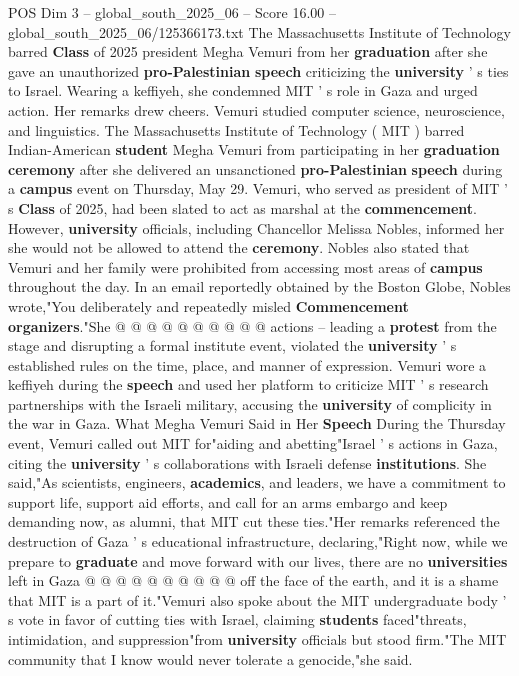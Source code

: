 \begin{textsample}{POS Dim 3 – global\_south\_2025\_06 – Score 16.00 – global\_south\_2025\_06/125366173.txt}  \label{ex:f3_pos_194}
The Massachusetts Institute of Technology barred \textbf{Class} of 2025 president Megha Vemuri from her \textbf{graduation} after she gave an unauthorized \textbf{pro-Palestinian} \textbf{speech} criticizing the \textbf{university} ' s ties to Israel.
Wearing a keffiyeh, she condemned MIT ' s role in Gaza and urged action.
Her remarks drew cheers.
Vemuri studied computer science, neuroscience, and linguistics.
The Massachusetts Institute of Technology ( MIT ) barred Indian-American \textbf{student} Megha Vemuri from participating in her \textbf{graduation} \textbf{ceremony} after she delivered an unsanctioned \textbf{pro-Palestinian} \textbf{speech} during a \textbf{campus} event on Thursday, May 29.
Vemuri, who served as president of MIT ' s \textbf{Class} of 2025, had been slated to act as marshal at the \textbf{commencement}.
However, \textbf{university} officials, including Chancellor Melissa Nobles, informed her she would not be allowed to attend the \textbf{ceremony}.
Nobles also stated that Vemuri and her family were prohibited from accessing most areas of \textbf{campus} throughout the day.
In an email reportedly obtained by the Boston Globe, Nobles wrote,"You deliberately and repeatedly misled \textbf{Commencement} \textbf{organizers}."She @ @ @ @ @ @ @ @ @ @ actions -- leading a \textbf{protest} from the stage and disrupting a formal institute event, violated the \textbf{university} ' s established rules on the time, place, and manner of expression.
Vemuri wore a keffiyeh during the \textbf{speech} and used her platform to criticize MIT ' s research partnerships with the Israeli military, accusing the \textbf{university} of complicity in the war in Gaza.
What Megha Vemuri Said in Her \textbf{Speech} During the Thursday event, Vemuri called out MIT for"aiding and abetting"Israel ' s actions in Gaza, citing the \textbf{university} ' s collaborations with Israeli defense \textbf{institutions}.
She said,"As scientists, engineers, \textbf{academics}, and leaders, we have a commitment to support life, support aid efforts, and call for an arms embargo and keep demanding now, as alumni, that MIT cut these ties."Her remarks referenced the destruction of Gaza ' s educational infrastructure, declaring,"Right now, while we prepare to \textbf{graduate} and move forward with our lives, there are no \textbf{universities} left in Gaza @ @ @ @ @ @ @ @ @ @ off the face of the earth, and it is a shame that MIT is a part of it."Vemuri also spoke about the MIT undergraduate body ' s vote in favor of cutting ties with Israel, claiming \textbf{students} faced"threats, intimidation, and suppression"from \textbf{university} officials but stood firm."The MIT community that I know would never tolerate a genocide,"she said.

\end{textsample}
